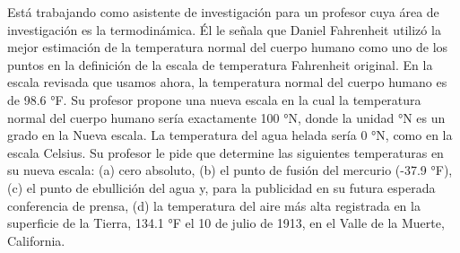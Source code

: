 \item Está trabajando como asistente de investigación para un profesor cuya área de investigación es la termodinámica. Él le señala que Daniel Fahrenheit utilizó la mejor estimación de la temperatura normal del cuerpo humano como uno de los puntos en la definición de la escala de temperatura Fahrenheit original. En la escala revisada que usamos ahora, la temperatura normal del cuerpo humano es de 98.6 °F. Su profesor propone una nueva escala en la cual la temperatura normal del cuerpo humano sería exactamente 100 °N, donde la unidad °N es un grado en la Nueva escala. La temperatura del agua helada sería 0 °N, como en la escala Celsius. Su profesor le pide que determine las siguientes temperaturas en su nueva escala: (a) cero absoluto, (b) el punto de fusión del mercurio (-37.9 °F), (c) el punto de ebullición del agua y, para la publicidad en su futura esperada conferencia de prensa, (d) la temperatura del aire más alta registrada en la superficie de la Tierra, 134.1 °F el 10 de julio de 1913, en el Valle de la Muerte, California.
